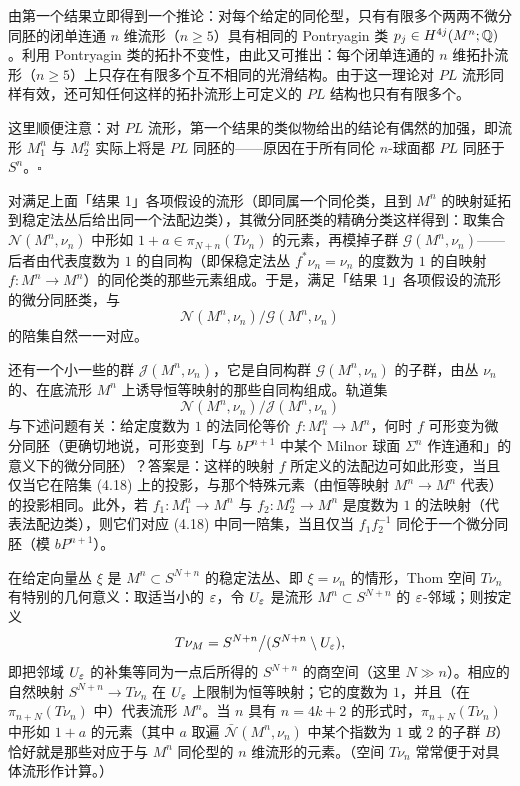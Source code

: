 由第一个结果立即得到一个推论：对每个给定的同伦型，只有有限多个两两不微分同胚的闭单连通 $n$ 维流形（$n\ge5$）具有相同的 Pontryagin 类 $p_j\in H^{4j}(M^n;\mathbb{Q})$。利用 Pontryagin 类的拓扑不变性，由此又可推出：每个闭单连通的 $n$ 维拓扑流形（$n\ge5$）上只存在有限多个互不相同的光滑结构。由于这一理论对 $PL$ 流形同样有效，还可知任何这样的拓扑流形上可定义的 $PL$ 结构也只有有限多个。

\begin{remark}{}
这里顺便注意：对 $PL$ 流形，第一个结果的类似物给出的结论有偶然的加强，即流形 $M^n_1$ 与 $M^n_2$ 实际上将是 $PL$ 同胚的——原因在于所有同伦 $n$-球面都 $PL$ 同胚于 $S^n$。\hfill$\square$
\end{remark}

对满足上面「结果 1」各项假设的流形（即同属一个同伦类，且到 $M^n$ 的映射延拓到稳定法丛后给出同一个法配边类），其微分同胚类的精确分类这样得到：取集合 $\mathcal{N}(M^n,\nu_n)$ 中形如 $1+a\in\pi_{N+n}(T\nu_n)$ 的元素，再模掉子群 $\mathcal{G}(M^n,\nu_n)$——后者由代表度数为 $1$ 的自同构（即保稳定法丛 $f^*\nu_n=\nu_n$ 的度数为 $1$ 的自映射 $f:M^n\to M^n$）的同伦类的那些元素组成。于是，满足「结果 1」各项假设的流形的微分同胚类，与
\begin{equation}
\mathcal{N}(M^n,\nu_n)/\mathcal{G}(M^n,\nu_n) \tag{4.17}
\end{equation}
的陪集自然一一对应。

还有一个小一些的群 $\mathcal{J}(M^n,\nu_n)$，它是自同构群 $\mathcal{G}(M^n,\nu_n)$ 的子群，由丛 $\nu_n$ 的、在底流形 $M^n$ 上诱导恒等映射的那些自同构组成。轨道集
\begin{equation}
\mathcal{N}(M^n,\nu_n)/\mathcal{J}(M^n,\nu_n) \tag{4.18}
\end{equation}
与下述问题有关：给定度数为 $1$ 的法同伦等价 $f:M^n_1\to M^n$，何时 $f$ 可形变为微分同胚（更确切地说，可形变到「与 $bP^{n+1}$ 中某个 Milnor 球面 $\Sigma^n$ 作连通和」的意义下的微分同胚）？答案是：这样的映射 $f$ 所定义的法配边可如此形变，当且仅当它在陪集 (4.18) 上的投影，与那个特殊元素（由恒等映射 $M^n\to M^n$ 代表）的投影相同。此外，若 $f_1:M^n_1\to M^n$ 与 $f_2:M^n_2\to M^n$ 是度数为 $1$ 的法映射（代表法配边类），则它们对应 (4.18) 中同一陪集，当且仅当 $f_1f_2^{-1}$ 同伦于一个微分同胚（模 $bP^{n+1}$）。

在给定向量丛 $\xi$ 是 $M^n\subset S^{N+n}$ 的稳定法丛、即 $\xi=\nu_n$ 的情形，Thom 空间 $T\nu_n$ 有特别的几何意义：取适当小的 $\varepsilon$，令 $U_\varepsilon$ 是流形 $M^n\subset S^{N+n}$ 的 $\varepsilon$-邻域；则按定义
\[
T\nu_M=S^{N+n}\big/(S^{N+n}\setminus U_\varepsilon),
\]
即把邻域 $U_\varepsilon$ 的补集等同为一点后所得的 $S^{N+n}$ 的商空间（这里 $N\gg n$）。相应的自然映射 $S^{N+n}\to T\nu_n$ 在 $U_\varepsilon$ 上限制为恒等映射；它的度数为 $1$，并且（在 $\pi_{n+N}(T\nu_n)$ 中）代表流形 $M^n$。当 $n$ 具有 $n=4k+2$ 的形式时，$\pi_{n+N}(T\nu_n)$ 中形如 $1+a$ 的元素（其中 $a$ 取遍 $\bar{\mathcal{N}}(M^n,\nu_n)$ 中某个指数为 $1$ 或 $2$ 的子群 $B$）恰好就是那些对应于与 $M^n$ 同伦型的 $n$ 维流形的元素。（空间 $T\nu_n$ 常常便于对具体流形作计算。）

